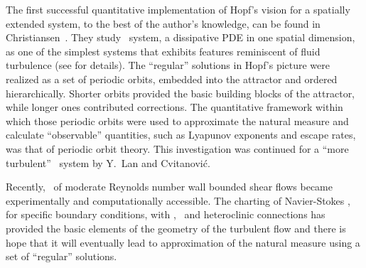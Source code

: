 The first successful quantitative implementation of Hopf's
vision for a spatially extended system, to the best of the
author's knowledge, can be found in
Christiansen~\etal{}. They study \KS\ system,
a dissipative PDE in one spatial dimension, as one of the
simplest systems that exhibits features reminiscent of fluid
turbulence (see  for details). The ``regular''
solutions in Hopf's picture were realized as a set of periodic
orbits, embedded into the attractor and ordered hierarchically.
Shorter orbits provided the basic building blocks of the
attractor, while longer ones contributed corrections. The
quantitative framework within which those periodic orbits were
used to approximate the natural measure and calculate
``observable'' quantities, such as Lyapunov exponents and
escape rates, was that of periodic orbit theory. This
investigation was continued for a ``more turbulent'' \KS\
system by Y.~Lan and Cvitanovi\'c.

Recently, \statesp\ of moderate Reynolds number wall bounded
shear flows became experimentally and
computationally
accessible. The charting of Navier-Stokes \statesp, for
specific boundary conditions, with \eqva, \reqva\
and heteroclinic connections has provided the basic elements of
the geometry of the turbulent flow and there is hope that it
will eventually lead to approximation of the natural measure
using a set of ``regular'' solutions.
